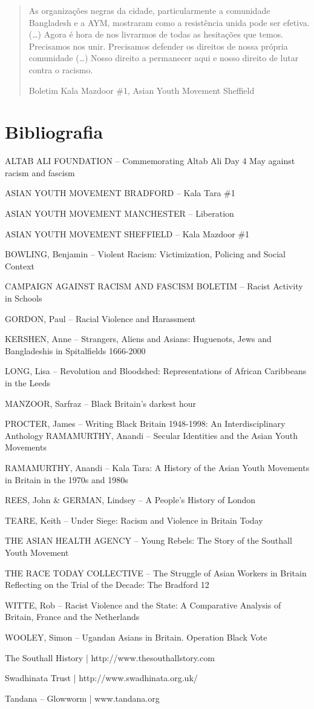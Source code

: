 \begin{quote}
As organizações negras da cidade, particularmente a comunidade Bangladesh e a AYM, mostraram como a resistência unida pode ser efetiva. (…) Agora é hora de nos livrarmos de todas as hesitações que temos. Precisamos nos unir. Precisamos defender os direitos de nossa própria comunidade (…) Nosso direito a permanecer aqui e nosso direito de lutar contra o racismo.

Boletim Kala Mazdoor \#1, Asian Youth Movement Sheffield
\end{quote}


\section{Bibliografia}

\begin{Parskip}
ALTAB ALI FOUNDATION – Commemorating Altab Ali Day 4 May against racism and fascism

ASIAN YOUTH MOVEMENT BRADFORD – Kala Tara \#1

ASIAN YOUTH MOVEMENT MANCHESTER – Liberation

ASIAN YOUTH MOVEMENT SHEFFIELD – Kala Mazdoor \#1

BOWLING, Benjamin – Violent Racism: Victimization, Policing and Social Context

CAMPAIGN AGAINST RACISM AND FASCISM BOLETIM – Racist Activity in Schools

GORDON, Paul – Racial Violence and Harassment

KERSHEN, Anne – Strangers, Aliens and Asians: Huguenots, Jews and Bangladeshis in Spitalfields 1666-2000

LONG, Lisa – Revolution and Bloodshed: Representations of African Caribbeans in the Leeds

MANZOOR, Sarfraz – Black Britain’s darkest hour

PROCTER, James – Writing Black Britain 1948-1998: An Interdisciplinary Anthology
RAMAMURTHY, Anandi – Secular Identities and the Asian Youth Movements

RAMAMURTHY, Anandi – Kala Tara: A History of the Asian Youth Movements in Britain in the 1970s and 1980s

REES, John \& GERMAN, Lindsey – A People’s History of London

TEARE, Keith – Under Siege: Racism and Violence in Britain Today

THE ASIAN HEALTH AGENCY – Young Rebels: The Story of the Southall Youth Movement

THE RACE TODAY COLLECTIVE – The Struggle of Asian Workers in Britain Reflecting on the Trial of the Decade: The Bradford 12

WITTE, Rob – Racist Violence and the State: A Comparative Analysis of Britain, France and the Netherlands

WOOLEY, Simon – Ugandan Asians in Britain. Operation Black Vote

The Southall History | http://www.thesouthallstory.com

Swadhinata Trust | http://www.swadhinata.org.uk/

Tandana – Glowworm | www.tandana.org
\end{Parskip}


